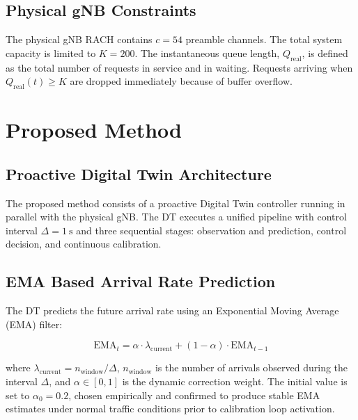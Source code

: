 \documentclass[conference]{IEEEtran}
\newcommand{\qreal}{Q_{\mathrm{real}}}
\newcommand{\ema}{\mathrm{EMA}}
\begin{document}
\subsection{Physical gNB Constraints}

The physical gNB RACH contains $c = 54$ preamble channels. The total system capacity is limited to $K = 200$. The instantaneous queue length, $\qreal$, is defined as the total number of requests in service and in waiting. Requests arriving when $\qreal(t) \geq K$ are dropped immediately because of buffer overflow.

\section{Proposed Method}

\subsection{Proactive Digital Twin Architecture}

The proposed method consists of a proactive Digital Twin controller running in parallel with the physical gNB. The DT executes a unified pipeline with control interval $\Delta = 1\ \mathrm{s}$ and three sequential stages: observation and prediction, control decision, and continuous calibration.

\subsection{EMA Based Arrival Rate Prediction}

The DT predicts the future arrival rate using an Exponential Moving Average (EMA) filter:

\begin{equation}
\ema_t = \alpha \cdot \lambda_{\mathrm{current}} + (1 - \alpha) \cdot \ema_{t-1}
\label{eq:ema}
\end{equation}

where $\lambda_{\mathrm{current}} = n_{\mathrm{window}}/\Delta$, $n_{\mathrm{window}}$ is the number of arrivals observed during the interval $\Delta$, and $\alpha \in [0,1]$ is the dynamic correction weight. The initial value is set to $\alpha_0 = 0.2$, chosen empirically and confirmed to produce stable EMA estimates under normal traffic conditions prior to calibration loop activation.
\end{document}
